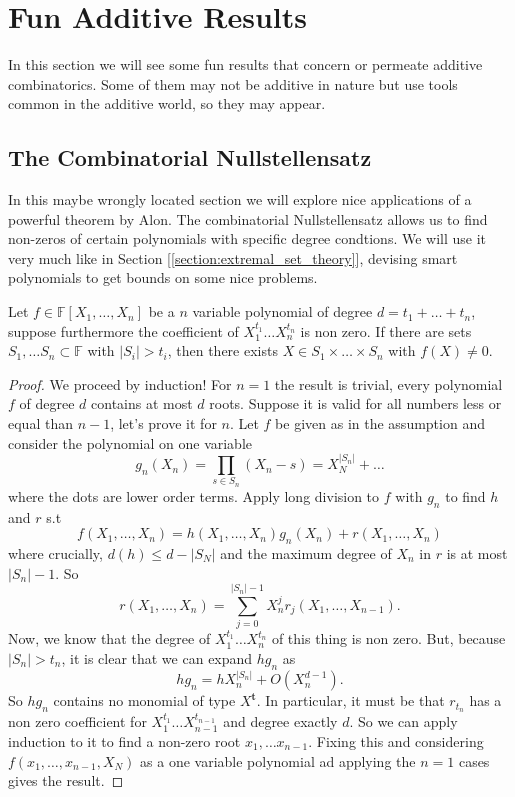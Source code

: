 \section{Fun Additive Results}
In this section we will see some fun results that concern or permeate
additive combinatorics.
Some of them may not be additive in nature but use tools common in
the additive world, so they may appear.

\subsection{The Combinatorial Nullstellensatz}
In this maybe wrongly located section we will explore nice applications
of a powerful theorem by Alon. The combinatorial Nullstellensatz
allows us to find non-zeros of certain polynomials with specific
degree condtions.
We will use it very much like in Section
[\ref{section:extremal_set_theory}], devising
smart polynomials to get bounds on some nice problems.

\begin{theorem}
	\label{trm:combinatorial_nullstellensatz}
	Let $f \in \mathbb{F}[X_1, \dots, X_n]$ be a $n$ variable polynomial
	of degree $d = t_1 + \dots + t_n$,
	suppose furthermore the coefficient of $X_1^{t_1} \dots X_n^{t_n}$ is non zero.
	If there are sets $S_1, \dots S_n \subset \mathbb{F}$  with $|S_i| > t_i$,
	then there exists $X \in S_1 \times \dots \times S_n$ with $f(X) \neq 0$.
\end{theorem}

\begin{proof}
	We proceed by induction! For $n = 1$ the result is trivial, every
	polynomial $f$ of degree $d$ contains
	at most $d$ roots. Suppose it is valid for all numbers less or equal
	than $n - 1$, let's prove it for $n$.
	Let $f$ be given as in the assumption and consider the polynomial on
	one variable
	\[
		g_n(X_n) = \prod_{s \in S_n} (X_n - s) = X_N^{|S_n|} + \dots
	\]
	where the dots are lower order terms. Apply long division to $f$
	with $g_n$ to find $h$ and $r$ s.t
	\[
		f(X_1, \dots, X_n) =  h(X_1, \dots, X_n)g_n(X_n) + r(X_1, \dots, X_n)
	\]
	where crucially, $d(h) \leq d - |S_N|$ and the maximum degree of
	$X_n$ in $r$ is at most $|S_n| - 1$.
	So
	\[
		r(X_1, \dots, X_n) = \sum_{j = 0}^{|S_n| - 1} X_n^j r_{j}(X_1,
		\dots, X_{n-1}).
	\]
	Now, we know that the degree of $X_1^{t_1} \dots X_n^{t_n}$ of this
	thing is non zero. But, because
	$|S_n| > t_n$, it is clear that we can expand $h g_n$ as
	\[
		hg_n = h X_n^{|S_n|} + O(X_n^{d-1}).
	\]
	So $hg_n$ contains no monomial of type $X^{\bm{t}}$. In particular,
	it must be that $r_{t_n}$ has a non zero coefficient for $X_1^{t_1}
	\dots X_{n-1}^{t_{n-1}}$ and degree exactly $d$.
	So we can apply induction to it to find a non-zero root $x_1, \dots
	x_{n-1}$. Fixing this and considering
	$f(x_1, \dots, x_{n-1}, X_N)$ as a one variable polynomial ad
	applying the $n=1$ cases gives the result.
\end{proof}

